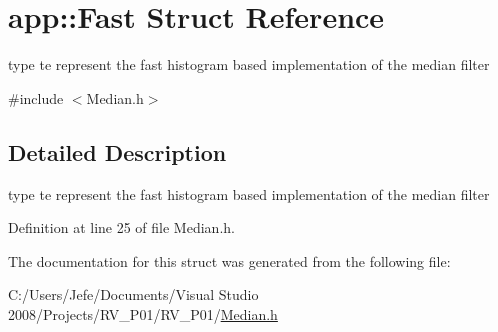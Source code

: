 \hypertarget{structapp_1_1_fast}{}\section{app\+:\+:Fast Struct Reference}
\label{structapp_1_1_fast}


type te represent the fast histogram based implementation of the median filter  




{\ttfamily \#include $<$Median.\+h$>$}



\subsection{Detailed Description}
type te represent the fast histogram based implementation of the median filter 

Definition at line 25 of file Median.\+h.



The documentation for this struct was generated from the following file\+:\begin{DoxyCompactItemize}
\item 
C\+:/\+Users/\+Jefe/\+Documents/\+Visual Studio 2008/\+Projects/\+R\+V\+\_\+\+P01/\+R\+V\+\_\+\+P01/\hyperlink{_median_8h}{Median.\+h}\end{DoxyCompactItemize}

